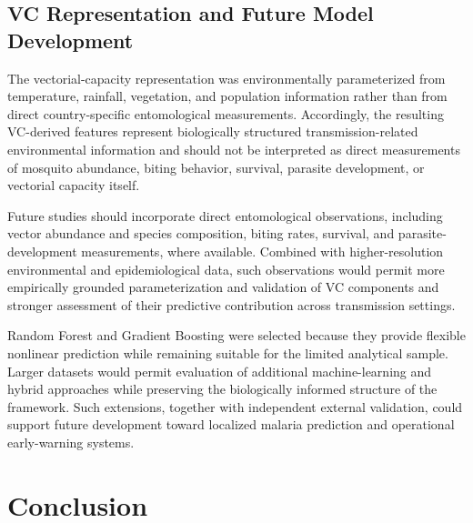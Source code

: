 \documentclass[10pt,twocolumn]{article}
\begin{document}
\subsection{VC Representation and Future Model Development}

The vectorial-capacity representation was environmentally parameterized
from temperature, rainfall, vegetation, and population information
rather than from direct country-specific entomological measurements.
Accordingly, the resulting VC-derived features represent biologically
structured transmission-related environmental information and should
not be interpreted as direct measurements of mosquito abundance,
biting behavior, survival, parasite development, or vectorial capacity
itself.

Future studies should incorporate direct entomological observations,
including vector abundance and species composition, biting rates,
survival, and parasite-development measurements, where available.
Combined with higher-resolution environmental and epidemiological data,
such observations would permit more empirically grounded
parameterization and validation of VC components and stronger
assessment of their predictive contribution across transmission
settings.

Random Forest and Gradient Boosting were selected because they provide
flexible nonlinear prediction while remaining suitable for the limited
analytical sample. Larger datasets would permit evaluation of
additional machine-learning and hybrid approaches while preserving the
biologically informed structure of the framework. Such extensions,
together with independent external validation, could support future
development toward localized malaria prediction and operational
early-warning systems.


\section{Conclusion}
\end{document}
